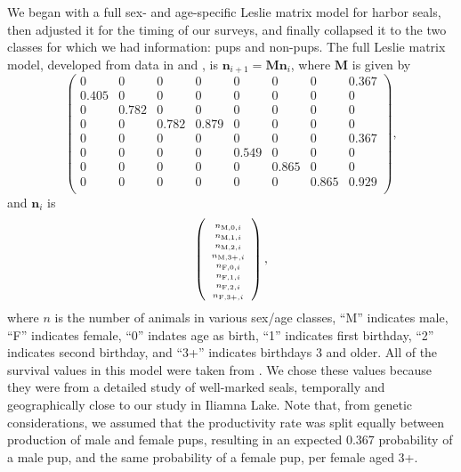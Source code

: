 \documentclass[]{risa}\usepackage[]{graphicx}\usepackage[]{color}
\newcommand{\bn}{\ensuremath{{\boldsymbol{\eta}}}}
\def\bn{\mathbf{n}}
\def\bM{\mathbf{M}}
\begin{document}
We began with a full sex- and age-specific Leslie matrix model for harbor seals, then adjusted it for the timing of our surveys, and finally collapsed it to the two classes for which we had information: pups and non-pups.  The full Leslie matrix model, developed from data in \citet{Hast:Smal:Pend:sex:2012} and \citet{Pitc:Calk:biol:1979}, is $\bn_{i+1} = \bM \bn_i$, where $\bM$ is given by
\begin{equation} \label{eq:LesMFull1}
  \left( \begin{smallmatrix} 
 0 & 0 & 0 & 0 & 0 & 0 & 0 & 0.367 \\ 
  0.405 & 0 & 0 & 0 & 0 & 0 & 0 & 0 \\ 
  0 & 0.782 & 0 & 0 & 0 & 0 & 0 & 0 \\ 
  0 & 0 & 0.782 & 0.879 & 0 & 0 & 0 & 0 \\ 
  0 & 0 & 0 & 0 & 0 & 0 & 0 & 0.367 \\ 
  0 & 0 & 0 & 0 & 0.549 & 0 & 0 & 0 \\ 
  0 & 0 & 0 & 0 & 0 & 0.865 & 0 & 0 \\ 
  0 & 0 & 0 & 0 & 0 & 0 & 0.865 & 0.929 \\ 
\end{smallmatrix} \right),
\end{equation}
and $\bn_i$ is
\begin{equation} \label{eq:n1}
  \left(\mbox{\scriptsize$\begin{array}{c}
    n_{\textrm{M,0},i} \\
    n_{\textrm{M,1},i} \\
    n_{\textrm{M,2},i} \\
    n_{\textrm{M,3+},i} \\
    n_{\textrm{F,0},i} \\
    n_{\textrm{F,1},i} \\
    n_{\textrm{F,2},i} \\
    n_{\textrm{F,3+},i} \\
  \end{array} $} \right),
\end{equation}
where $n$ is the number of animals in various sex/age classes, ``M'' indicates male, ``F'' indicates female, ``0'' indates age as birth, ``1'' indicates first birthday, ``2'' indicates second birthday, and ``3+'' indicates birthdays 3 and older. All of the survival values in this model were taken from \citet[][Table 2, part a]{Hast:Smal:Pend:sex:2012}.  We chose these values because they were from a detailed study of well-marked seals, temporally and geographically close to our study in Iliamna Lake. Note that, from genetic considerations, we assumed that the productivity rate was split equally between production of male and female pups, resulting in an expected 0.367 probability of a male pup, and the same probability of a female pup, per female aged 3+.
\end{document}

